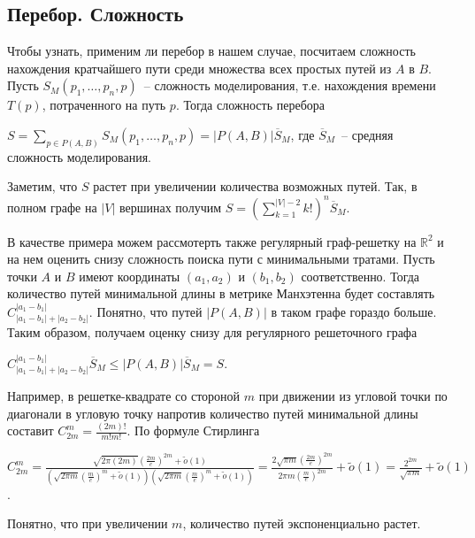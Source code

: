 \documentclass[12pt, a4paper]{article}
\begin{document}
	\subsection{Перебор. Сложность}
	Чтобы узнать, применим ли перебор в нашем случае, посчитаем сложность нахождения кратчайшего пути среди множества всех простых путей из $A$ в $B$. Пусть $S_M(p_1, \ldots, p_n, p)$~-- сложность моделирования, т.е. нахождения времени $T(p)$, потраченного на путь $p$.
	Тогда сложность перебора
	\begin{center}
		$S = \sum\limits_{p \in P(A,B)} S_M(p_1, \ldots, p_n, p) = \vert P(A,B) \vert \overline S_M$, где $\overline S_M$~-- средняя сложность моделирования.
	\end{center}
	Заметим, что $ S $ растет при увеличении количества возможных путей. Так, в полном графе на $\vert V \vert$ вершинах получим $S = \left(\sum\limits_{k = 1}^{|V| - 2} k!\right)^n \overline S_M$.
	
	В качестве примера можем рассмотерть также регулярный граф-решетку на $\mathbb {R}^2$ и на нем оценить снизу сложность поиска пути с минимальными тратами. Пусть точки $A$ и $B$ имеют координаты $(a_1, a_2)$ и $(b_1, b_2)$ соответственно. Тогда количество путей минимальной длины в метрике Манхэтенна будет составлять $C^{|a_1-b_1|}_{|a_1-b_1| + |a_2-b_2|}$. Понятно, что путей $|P(A,B)|$ в таком графе гораздо больше. Таким образом, получаем оценку снизу для регулярного решеточного графа
	
	\begin{center}
		$C^{|a_1-b_1|}_{|a_1-b_1| + |a_2-b_2|} \overline S_M  \leq  \vert P(A,B) \vert \overline S_M = S$.
	\end{center}
	
	Например, в решетке-квадрате со стороной $m$ при движении из угловой точки по диагонали в угловую точку напротив количество путей минимальной длины составит $C^m_{2m} = \frac{(2m)!}{m!m!} $. По формуле Стирлинга
	\begin{center}
		$ C^m_{2m} = \frac{\sqrt{2\pi(2m)} \left( \frac{2m}{e} \right)^{2m} + \tilde{o}(1)}{\left(\sqrt{2\pi m} \left( \frac{m}{e} \right)^m + \tilde{o}(1)\right)  \left(\sqrt{2\pi m} \left( \frac{m}{e} \right)^m + \tilde{o}(1)\right)} = \frac{2\sqrt{\pi m} \left( \frac{2m}{e} \right)^{2m}}{2\pi m \left( \frac{m}{e} \right)^{2m}} + \tilde{o}(1) = \frac{2^{2m}}{\sqrt{\pi m}} + \tilde{o}(1)$.
	\end{center}
	Понятно, что при увеличении $m$, количество путей экспоненциально растет.
	
\end{document}

